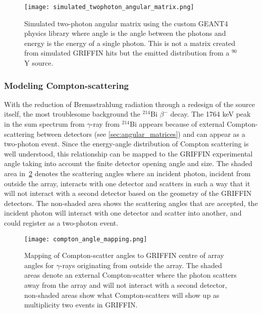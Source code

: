 \documentclass[cnatzke_thesis_proposal.tex]{subfiles}
\begin{document}
\begin{figure}[htbp]
  \centering
  \texttt{[image: simulated\_twophoton\_angular\_matrix.png]}
  \caption{Simulated two-photon angular matrix using the custom GEANT4 physics library where angle is the angle between the photons and energy is the energy of a single photon. This is not a matrix created from simulated GRIFFIN hits but the emitted distribution from a $^{90}$Y source.}
  \label{fig:simulated_twophoton_angular_matrix}
\end{figure}

\subsubsection{Modeling Compton-scattering}
\label{sec:compton_scatter}
With the reduction of Bremsstrahlung radiation through a redesign of the source itself, the most troublesome background the $^{214}$Bi $\beta^-$ decay.
The 1764 keV peak in the sum spectrum from $\gamma$-ray from $^{214}$Bi appears because of external Compton-scattering between detectors (see \ref{sec:angular_matrices}) and can appear as a two-photon event.
Since the energy-angle distribution of Compton scattering is well understood, this relationship can be mapped to the GRIFFIN experimental angle taking into account the finite detector opening angle and size.
The shaded area in~\ref{fig:compton_angle_mapping} denotes the scattering angles where an incident photon, incident from outside the array, interacts with one detector and scatters in such a way that it will not interact with a second detector based on the geometry of the GRIFFIN detectors. 
The non-shaded area shows the scattering angles that are accepted, the incident photon will interact with one detector and scatter into another, and could register as a two-photon event.


\begin{figure}[htbp]
  \centering
  \texttt{[image: compton\_angle\_mapping.png]}
  \caption{Mapping of Compton-scatter angles to GRIFFIN centre of array angles for $\gamma$-rays originating from outside the array. The shaded areas denote an external Compton-scatter where the photon scatters away from the array and will not interact with a second detector, non-shaded areas show what Compton-scatters will show up as multiplicity two events in GRIFFIN.}
  \label{fig:compton_angle_mapping}
\end{figure}
\end{document}
